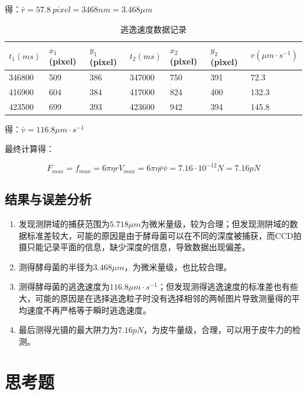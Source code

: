 \documentclass[a4paper,UTF8]{ctexart}
\begin{document}
得：$\bar{r} = 57.8 \ pixel = 3468 nm = 3.468 \mu m$

\begin{table}[H]
    \centering
    \caption{逃逸速度数据记录}
    \begin{tabular}{|l|l|l|l|l|l|l|}
    \hline
        $t_1(ms)$ & $x_1$(pixel) & $y_1$(pixel) & $t_2(ms)$ & $x_2$(pixel) & $y_2$(pixel) & $v(\mu m \cdot s^{-1})$ \\ \hline
        346800 & 509 & 386 & 347000 & 750 & 391 & 72.3 \\ \hline
        416900 & 604 & 384 & 417000 & 824 & 400 & 132.3 \\ \hline
        423500 & 699 & 393 & 423600 & 942 & 394 & 145.8 \\ \hline
    \end{tabular}
\end{table}

得：$\bar{v} = 116.8 \mu m \cdot s^{-1}$

最终计算得：

\begin{equation}
    F_{max} = f_{max}=6\pi \eta r V_{max} = 6\pi \eta \bar{r} \bar{v} = 7.16 \cdot 10^{-12} N = 7.16 pN
\end{equation}

\subsection{结果与误差分析}

\begin{enumerate}
    \item 发现测阱域的捕获范围为$5.718\mu m$为微米量级，较为合理；但发现测阱域的数据标准差较大，可能的原因是由于酵母菌可以在不同的深度被捕获，而CCD拍摄只能记录平面的信息，缺少深度的信息，导致数据出现偏差。
    \item 测得酵母菌的半径为$3.468\mu m$，为微米量级，也比较合理。
    \item 测得酵母菌的逃逸速度为$116.8 \mu m \cdot s^{-1}$；但发现测得逃逸速度的标准差也有些大，可能的原因是在选择逃逸粒子时没有选择相邻的两帧图片导致测量得的平均速度不再严格等于瞬时逃逸速度。
    \item 最后测得光镊的最大阱力为$7.16pN$，为皮牛量级，合理，可以用于皮牛力的检测。
\end{enumerate}

\section{思考题}
\end{document}
